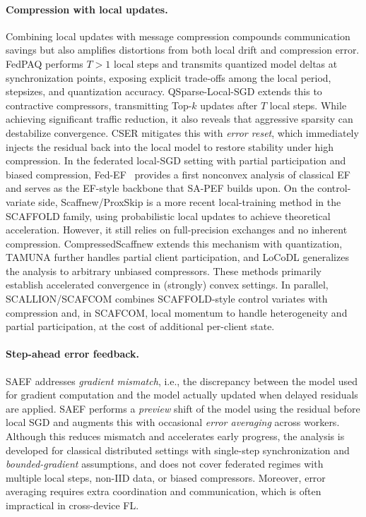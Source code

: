 \documentclass{article} %
\begin{document}
\paragraph{Compression with local updates.}
Combining local updates with message compression compounds communication savings but also amplifies distortions from both local drift and compression error. FedPAQ \citep{reisizadeh2020fedpaq} performs $T>1$ local steps and transmits quantized model deltas at synchronization points, exposing explicit trade-offs among the local period, stepsizes, and quantization accuracy. QSparse-Local-SGD \citep{basu2019qsparse} extends this to contractive compressors, transmitting Top-$k$ updates after $T$ local steps. While achieving significant traffic reduction, it also reveals that aggressive sparsity can destabilize convergence. CSER \citep{xie2020cser} mitigates this with \emph{error reset}, which immediately injects the residual back into the local model to restore stability under high compression. 
In the federated local-SGD setting with partial participation and biased compression, Fed-EF~\citep{li2023analysis} provides a first nonconvex analysis of classical EF and serves as the EF-style backbone that SA-PEF builds upon. 
On the control-variate side, 
Scaffnew/ProxSkip \citep{mishchenko2022proxskip} is a more recent local-training method in the SCAFFOLD family, using probabilistic local updates to achieve theoretical acceleration. However, it still relies on full-precision exchanges and no inherent compression. CompressedScaffnew \citep{condat2022provably} extends this mechanism with quantization, TAMUNA \citep{condat2023tamuna} further handles partial client participation, and LoCoDL \citep{condat2025locodl} generalizes the analysis to arbitrary unbiased compressors. These methods primarily establish accelerated convergence in (strongly) convex settings. In parallel, SCALLION/SCAFCOM \citep{huang2024stochastic} combines SCAFFOLD-style control variates with compression and, in SCAFCOM, local momentum to handle heterogeneity and partial participation, at the cost of additional per-client state.

\paragraph{Step-ahead error feedback.}
SAEF \citep{xu2021step} addresses \emph{gradient mismatch}, i.e., the discrepancy between the model used for gradient computation and the model actually updated when delayed residuals are applied. SAEF performs a \emph{preview} shift of the model using the residual before local SGD and augments this with occasional \emph{error averaging} across workers. Although this reduces mismatch and accelerates early progress, the analysis is developed for classical distributed settings with single-step synchronization and \emph{bounded-gradient} assumptions, and does not cover federated regimes with multiple local steps, non-IID data, or biased compressors. Moreover, error averaging requires extra coordination and communication, which is often impractical in cross-device FL.
\end{document}
